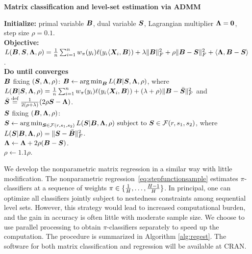 \documentclass[11pt]{article}
\theoremstyle{plain}
\theoremstyle{definition}
\begin{document}
 \begin{algorithm}[h!]
  \caption{{\bf Matrix classification and level-set estimation via ADMM} } \label{alg:weighted}
{\bf Initialize:} primal variable $\bm B$, dual variable $\bm S$, Lagrangian multiplier $\bm{\Lambda}=\mathbf{0}$, step size $\rho=0.1$.\\[.1cm]
{\bf Objective: } $
L(\bm B,\bm S,\bm{\Lambda},\rho)={1\over n}\sum_{i=1}^nw_\pi(y_i)\ell(y_i\langle \bm X_i,\bm B \rangle) + \lambda\lVert\bm B\rVert_F^2+\rho\lVert\bm B-\bm S\rVert_F^2+\langle \bm{\Lambda}, \bm B-\bm S\rangle$.\\[.1cm]
{\bf Do until converges}\\[.1cm]
\hspace*{.2cm}{\bf Update} $\bm B$ fixing $(\bm S,\bm{\Lambda},\rho)$: 
$\bm B \leftarrow \operatorname*{arg\,min}_{\bm B} L(\bm B|\bm S,\bm{\Lambda},\rho)$, where $L(\bm B|\bm S,\bm{\Lambda},\rho)={1\over n}\sum_{i=1}^n w_\pi(y_i)\ell(y_i\langle\bm X_i,\bm B\rangle)+(\lambda+\rho)\lVert\bm B-\bar {\bm S}\rVert_F^2$ and $\bar {\bm S}\stackrel{\text{def}}{=}{1\over 2(\rho+\lambda)}(2\rho\bm S-\bm{\Lambda})$. \\[.1cm]
\hspace*{.2cm}{\bf Update} $\bm S$ fixing $(\bm B,\bm{\Lambda},\rho)$: $\bm S \leftarrow  \operatorname*{arg\,min}_{\bm S\in \mathcal{F}(r,s_1,s_2)}L(\bm S|\bm B,\bm{\Lambda},\rho) \ \text{subject to }\bm S\in\mathcal{F}(r,s_1,s_2)$, where $ L(\bm S|\bm B,\bm{\Lambda},\rho)=\lVert\bm S-\bar {\bm B}\rVert_F^2$.\\[.1cm]
\hspace*{.2cm}{\bf Update} $\bm{\Lambda} \leftarrow \bm{\Lambda}+2\rho(\bm B-\bm S)$.\\[.1cm]
 \hspace*{.2cm}{\bf Update} $\rho\leftarrow1.1\rho$.\\[.1cm]
\end{algorithm}

We develop the nonparametric matrix regression in a similar way with little modification. The nonparametric regression~\eqref{eq:stepfunctionsample} estimates $\pi$-classifiers at a sequence of weights $\pi \in \{{1\over H},\ldots, {H-1\over H}\}$. In principal, one can optimize all classifiers jointly subject to nestedness constraints among sequential level sets. However, this strategy would lead to increased computational burden, and the gain in accuracy is often little with moderate sample size. We choose to use parallel processing to obtain $\pi$-classifiers separately to speed up the computation. The procedure is summarized in Algorithm \ref{alg:regest}. The software for both matrix classification and regression will be available at CRAN.
\end{document}
